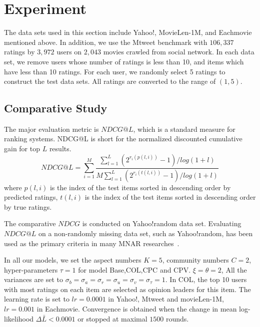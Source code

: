 \documentclass[sigconf]{acmart}
\begin{document}
\section{Experiment}\label{sec:experiment}

The data sets used in this section include Yahoo!, MovieLen-1M, and Eachmovie mentioned above. In addition, we use the Mtweet benchmark with $106,337$ ratings by $3,972$ users on $2,043$ movies crawled from social network. In each data set, we remove users whose number of ratings is less than 10, and items which have less than 10 ratings. For each user, we randomly select 5 ratings to construct the test data sets. All ratings are converted to the range of $(1,5)$.


\subsection{Comparative Study}

The major evaluation metric is $NDCG@L$, which is a standard measure for ranking systems.   NDCG@L is short for the normalized discounted cumulative gain for top $L$ results.
\begin{equation}
NDCG@L=\sum\limits_{i=1}^{M}\frac{\sum_{l=1}^{L}(2^{r_{i}(p(l,i))}-1)/log(1+l)}{M\sum_{l=1}^{L}(2^{r_{i}(t(l,i))}-1)/log(1+l)}
\end{equation}
where $p(l,i)$ is the index of the test items sorted in descending order by predicted ratings, $t(l,i)$ is the index of the test items sorted in descending order by true ratings.

The comparative $NDCG$ is conducted on Yahoo!random data set. Evaluating $NDCG@L$ on a non-randomly missing data set, such as Yahoo!random, has been used as the primary criteria in many MNAR researches~\cite{Hernandez-Lobato2014Probabilistic,Marlin2009Collaborative}.

In all our models, we set the aspect numbers $K=5$, community numbers $C=2$, hyper-parameters  $\tau=1$ for model Base,COL,CPC and CPV.  $\xi=\theta=2$, All the variances are set to $\sigma_b=\sigma_a=\sigma_r=\sigma_u=\sigma_v=\sigma_\tau=1$. In COL, the top 10 users with most ratings on each item are selected as opinion leaders for this item. The learning rate is set to $lr=0.0001$ in Yahoo!, Mtweet and movieLen-1M, $lr=0.001$ in Eachmovie. Convergence is obtained when the change in mean log-likelihood $\Delta\bar{L}<0.0001$ or stopped at maximal $1500$ rounds.
\end{document}
